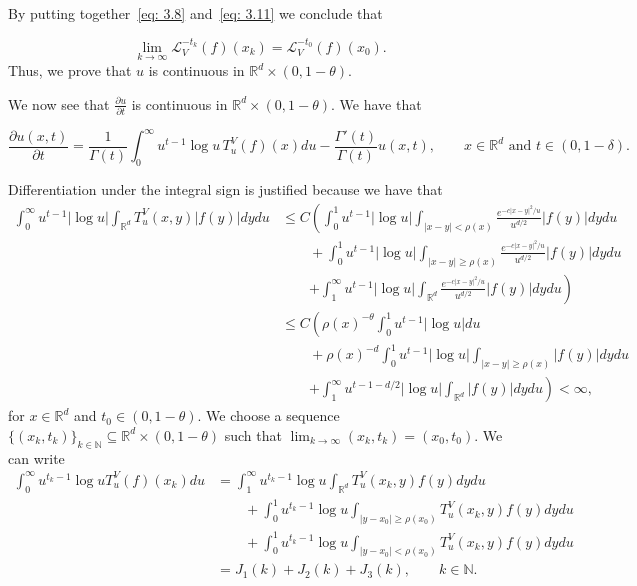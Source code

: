 \documentclass[10pt, a4paper, reqno]{amsart}
\theoremstyle{definition}
\theoremstyle{remark}
\newcommand{\RR}{\mathbb{R}}
\newcommand{\NN}{\mathbb{N}}
\numberwithin{equation}{section}
\begin{document}
By putting together~\eqref{eq: 3.8} and~\eqref{eq: 3.11} we conclude that

\begin{equation}
    \lim_{k\rightarrow \infty} \mathcal{L}_V^{-t_k} (f)(x_k) = \mathcal{L}_V^{-t_0} (f)(x_0).
\end{equation}
Thus, we prove that $u$ is continuous in $\RR^d \times (0,1-\theta)$. 

We now see that $\frac{\partial u}{\partial t}$ is continuous in $\RR^d \times (0,1-\theta)$. We have that

\begin{equation*}
    \frac{\partial u (x,t)}{\partial t} = \frac{1}{\Gamma(t)} \int_0^\infty u^{t-1} \log u \, T_u^V(f)(x) du {-} \frac{\Gamma'(t)}{\Gamma(t)} u(x,t), \qquad x\in\RR^d \text{ and } t\in (0,1-\delta). 
\end{equation*}

Differentiation under the integral sign is justified because we have that
\begin{equation*}
    \begin{split}
        \int_0^\infty u^{t-1} |\log u| \int_{\RR^d} T_u^V(x,y) |f(y)| dy du & \leq C \left( \int_0^1 u^{t-1} |\log u|  \int_{|x-y|<\rho(x)} \frac{e^{-c|x-y|^2/u}}{u^{d/2}} |f(y)| dy du \right.
        \\ & \qquad + \int_0^1 u^{t-1} |\log u|  \int_{|x-y|\geq\rho(x)} \frac{e^{-c|x-y|^2/u}}{u^{d/2}} |f(y)| dy du
        \\ & \qquad \left. + 
        \int_1^\infty u^{t-1} |\log u|  \int_{\RR^d} \frac{e^{-c|x-y|^2/u}}{u^{d/2}} |f(y)| dy du\right)
        \\ & \leq C  \left( \rho(x)^{-\theta}\int_0^1 u^{t-1} |\log u|  du  \right.
        \\ & \qquad +  \rho(x)^{-d} \int_0^1 u^{t-1} |\log u|   \int_{|x-y|\geq \rho(x)} {|f(y)| dy du }
        \\ & \qquad \left. + 
        \int_1^\infty u^{t-1-d/2} |\log u|  \int_{\RR^d}  |f(y)| dy du\right) <\infty,
    \end{split}
\end{equation*}
for $x\in \RR^d$ and $t_0\in(0,1-\theta)$. We choose a sequence $\{(x_k,t_k)\}_{k\in \NN}\subseteq \RR^d \times (0,1-\theta)$ such that  $\displaystyle \lim_{k\rightarrow \infty} (x_k,t_k) = (x_0,t_0)$. We can write
\begin{equation*}
\begin{split}
    \int_0^\infty u^{t_k-1} \log u T_u^V(f)(x_k)du & = \int_1^\infty u^{t_k-1} \log u \int_{\RR^d} T_u^V (x_k,y) f(y) dy du 
    \\ & \qquad +
    \int_{0}^1 u^{t_k -1} \log u \int_{|y-x_0|\geq \rho(x_0)} T_u^V (x_k,y) f(y) dy du
    \\ & \qquad + \int_{0}^1 u^{t_k -1} \log u \int_{|y-x_0|< \rho(x_0)} T_u^V (x_k,y) f(y) dy du
    \\ & = J_1(k) + J_2(k) + J_3(k), \qquad  k\in \NN.
\end{split}
\end{equation*}
\end{document}
